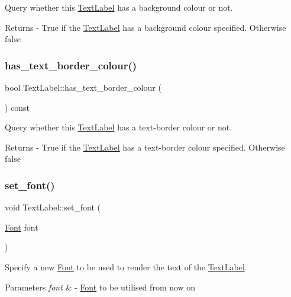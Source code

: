 Query whether this \mbox{\hyperlink{class_text_label}{Text\+Label}} has a background colour or not. \begin{DoxyReturn}{Returns}
-\/ True if the \mbox{\hyperlink{class_text_label}{Text\+Label}} has a background colour specified. Otherwise false 
\end{DoxyReturn}
\mbox{\label{class_text_label_a3ebd1440ba16deddd630f59e32def63e}} 
\subsubsection{\texorpdfstring{has\+\_\+text\+\_\+border\+\_\+colour()}{has\_text\_border\_colour()}}
{\footnotesize\ttfamily bool Text\+Label\+::has\+\_\+text\+\_\+border\+\_\+colour (\begin{DoxyParamCaption}{ }\end{DoxyParamCaption}) const}

Query whether this \mbox{\hyperlink{class_text_label}{Text\+Label}} has a text-\/border colour or not. \begin{DoxyReturn}{Returns}
-\/ True if the \mbox{\hyperlink{class_text_label}{Text\+Label}} has a text-\/border colour specified. Otherwise false 
\end{DoxyReturn}
\mbox{\label{class_text_label_a899b24fdb8ce8adf213cb70461aa1d91}} 
\subsubsection{\texorpdfstring{set\+\_\+font()}{set\_font()}}
{\footnotesize\ttfamily void Text\+Label\+::set\+\_\+font (\begin{DoxyParamCaption}\item[{\mbox{\hyperlink{class_font}{Font}}}]{font }\end{DoxyParamCaption})}

Specify a new \mbox{\hyperlink{class_font}{Font}} to be used to render the text of the \mbox{\hyperlink{class_text_label}{Text\+Label}}. 
\begin{DoxyParams}{Parameters}
{\em font} & -\/ \mbox{\hyperlink{class_font}{Font}} to be utilised from now on \\
\hline
\end{DoxyParams}
\mbox{\label{class_text_label_ad8d83bed9697b2f53249218f560fe1a8}} 
